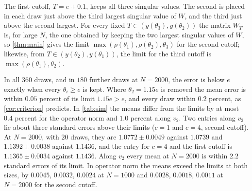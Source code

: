 \documentclass[11pt]{amsart}
\theoremstyle{remark}
\numberwithin{equation}{section}
\begin{document}
The first cutoff, $T=e+0.1$, keeps all three singular values. The second is placed in each draw just above the third largest singular value of $W$, and the third just above the second largest. For every fixed $T\in(y(\theta_3),y(\theta_2))$ the matrix $W_T$ is, for large $N$, the one obtained by keeping the two largest singular values of $W$, so \cref{thm:main} gives the limit $\max(\rho(\theta_1),\rho(\theta_2),\theta_3)$ for the second cutoff; likewise, from $T\in(y(\theta_2),y(\theta_1))$, the limit for the third cutoff is $\max(\rho(\theta_1),\theta_2)$.

In all $360$ draws, and in $180$ further draws at $N=2000$, the error is below $e$ exactly when every $\theta_i\ge e$ is kept. Where $\theta_2=1.15e$ is removed the mean error is within $0.05$ percent of its limit $1.15e>e$, and every draw within $0.2$ percent, as \cref{cor:criterion} predicts. In \cref{tab:sim} the means differ from the limits by at most $0.4$ percent for the operator norm and $1.0$ percent along $v_2$. Two entries along $v_2$ lie about three standard errors above their limits ($c=1$ and $c=4$, second cutoff). At $N=2000$, with $20$ draws, they are $1.0772\pm0.0049$ against $1.0739$ and $1.1392\pm0.0038$ against $1.1436$, and the entry for $c=4$ and the first cutoff is $1.1365\pm0.0034$ against $1.1436$. Along $v_2$ every mean at $N=2000$ is within $2.2$ standard errors of its limit. In operator norm the means exceed the limits at both sizes, by $0.0045$, $0.0032$, $0.0024$ at $N=1000$ and $0.0028$, $0.0018$, $0.0011$ at $N=2000$ for the second cutoff.
\end{document}
